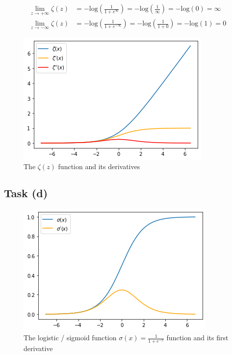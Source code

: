 \documentclass[onecolumn]{article}
\begin{document}
\[
\begin{aligned}
	\lim_{z\to+\infty}\zeta(z)&=-\text{log}\left(\frac{1}{1+e^\infty}\right)
	=-\text{log}\left(\frac{1}{\infty}\right)
	=-\text{log}\left(0\right)=\infty \\
	\lim_{z\to-\infty}\zeta(z)&=-\text{log}\left(\frac{1}{1+e^{-\infty}}\right)
	=-\text{log}\left(\frac{1}{1+0}\right)
	=-\text{log}\left(1\right)=0
\end{aligned}
\]
\begin{figure}[hbt!]
	\centering
	\includegraphics[width=.6\linewidth]{taskc.png}
	\caption{The $\zeta(z)$ function and its derivatives}
\end{figure}

\subsection{Task (d)}
\begin{figure}[hbt!]
	\centering
	\includegraphics[width=.6\linewidth]{taskd.png}
	\caption{The logistic / sigmoid function $\sigma(x)=\frac{1}{1+e^{-x}}$ function and its first derivative}
\end{figure}
\end{document}
